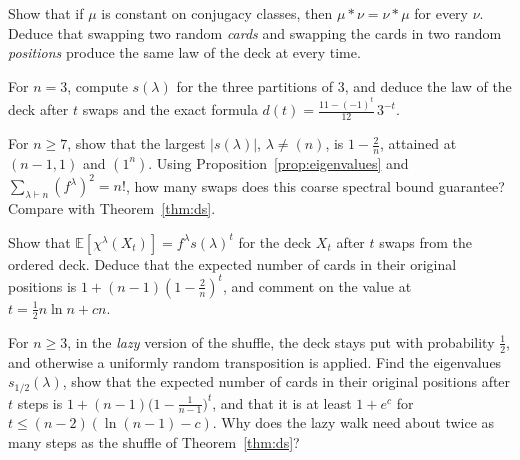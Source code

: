 \begin{exercise}[$\star$]\label{ex:leftright}
Show that if $\mu$ is constant on conjugacy classes, then $\mu*\nu=\nu*\mu$ for every $\nu$. Deduce that swapping two random \emph{cards} and swapping the cards in two random \emph{positions} produce the same law of the deck at every time.
\end{exercise}

\begin{exercise}[$\star$]\label{ex:threecards}
For $n=3$, compute $s(\lambda)$ for the three partitions of $3$, and deduce the law of the deck after $t$ swaps and the exact formula $d(t)=\frac{11-(-1)^t}{12}\,3^{-t}$.
\end{exercise}

\begin{exercise}[$\star$]\label{ex:spectralonly}
For $n\ge7$, show that the largest $|s(\lambda)|$, $\lambda\ne(n)$, is $1-\frac2n$, attained at $(n-1,1)$ and $(1^n)$. Using Proposition~\ref{prop:eigenvalues} and $\sum_{\lambda\vdash n}(f^\lambda)^2=n!$, how many swaps does this coarse spectral bound guarantee? Compare with Theorem~\ref{thm:ds}.
\end{exercise}

\begin{exercise}[$\star\star$]\label{ex:fixedpoints}
Show that $\mathbb E[\chi^\lambda(X_t)]=f^\lambda s(\lambda)^t$ for the deck $X_t$ after $t$ swaps from the ordered deck. Deduce that the expected number of cards in their original positions is $1+(n-1)(1-\frac2n)^t$, and comment on the value at $t=\frac12n\ln n+cn$.
\end{exercise}

\begin{exercise}[$\star\star$]\label{ex:lazyhalf}
For $n\ge3$, in the \emph{lazy} version of the shuffle, the deck stays put with probability $\frac12$, and otherwise a uniformly random transposition is applied. Find the eigenvalues $s_{1/2}(\lambda)$, show that the expected number of cards in their original positions after $t$ steps is
$1+(n-1)\bigl(1-\frac1{n-1}\bigr)^t$, and that it is at least $1+e^c$ for $t\le(n-2)(\ln(n-1)-c)$. Why does the lazy walk need about twice as many steps as the shuffle of Theorem~\ref{thm:ds}?
\end{exercise}

